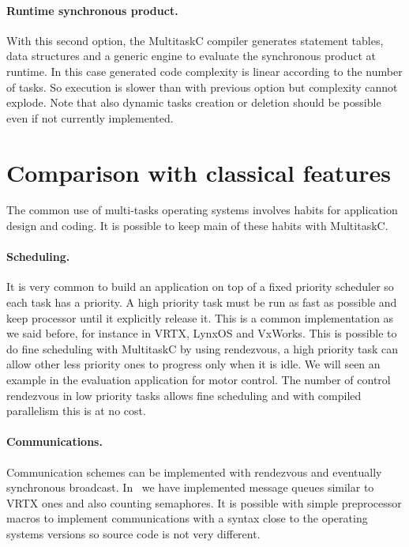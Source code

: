 \documentclass[10pt]{report}
\begin{document}
\paragraph{Runtime synchronous product.} With this second option, the MultitaskC compiler generates statement
tables, data structures and a generic engine to evaluate the synchronous product at runtime. In this case
generated code complexity is linear according to the number of tasks. So execution is slower than with
previous option but complexity cannot explode. Note that also dynamic tasks creation or deletion should
be possible even if not currently implemented.

\section{Comparison with classical features}

The common use of multi-tasks operating systems involves habits for application design and coding. It is
possible to keep main of these habits with MultitaskC.

\paragraph{Scheduling.} It is very common to build an application on top of a fixed priority scheduler
so each task has a priority. A high priority task must be run as fast as possible and keep processor
until it explicitly release it. This is a common implementation as we said before, for instance in VRTX,
LynxOS and VxWorks. This is possible to do fine scheduling with MultitaskC by using rendezvous, a high
priority task can allow other less priority ones to progress only when it is idle. We will seen an
example in the evaluation application for motor control. The number of control rendezvous in low priority
tasks allows fine scheduling and with compiled parallelism this is at no cost.

\paragraph{Communications.} Communication schemes can be implemented with rendezvous and eventually
synchronous broadcast. In~\cite{Delchini:95} we have implemented message queues similar to VRTX ones
and also counting semaphores. It is possible with simple preprocessor macros to implement communications
with a syntax close to the operating systems versions so source code is not very different.
\end{document}
